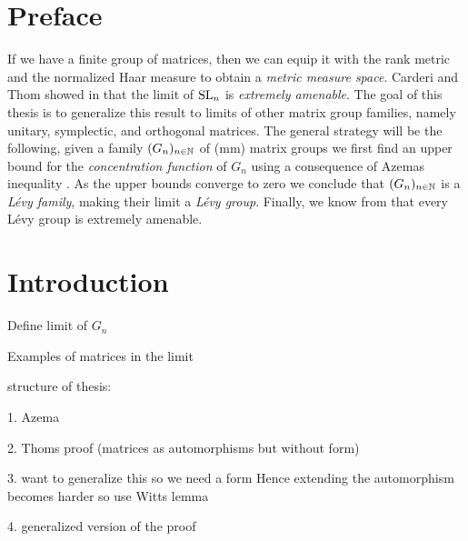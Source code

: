 \section*{Preface}
If we have a finite group of matrices, then we can equip it with the rank metric and the normalized Haar measure to obtain a \emph{metric measure space}.
Carderi and Thom  showed in \cite{thom} that the limit of $\operatorname{SL}_n$ is \emph{extremely amenable}. The goal of this thesis is to generalize this result to limits of other matrix group families, namely unitary, symplectic, and orthogonal matrices. The general strategy will be the following, given a family $(G_n)_{n\in\mathbb{N}}$ of (mm) matrix groups we first find an upper bound for the \emph{concentration function} of $G_n$ using a consequence of Azemas inequality \cite{Azema book}. As the upper bounds converge to zero we conclude that $(G_n)_{n\in\mathbb{N}}$ is a \emph{L\'{e}vy family}, making their limit a \emph{L\'{e}vy group}. Finally, we know from \cite{29} that every L\'{e}vy group is extremely amenable.

\section{Introduction}

Define limit of $G_n$

Examples of matrices in the limit

structure of thesis:

1. Azema

2. Thoms proof (matrices as automorphisms but without form)

3. want to generalize this so we need a form Hence extending the automorphism becomes harder so use Witts lemma

4. generalized version of the proof